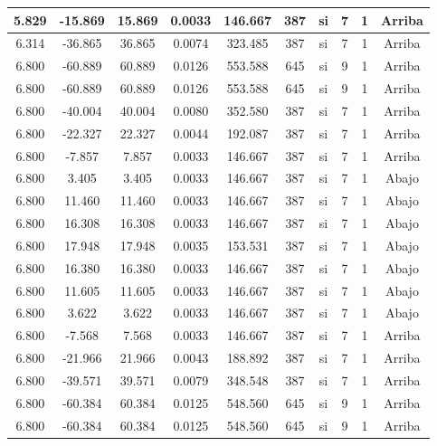 \begin{table}[H]
{\begin{tabular}{|c|c|c|c|c|c|c|c|c|c|}
    \hline
    5.829 & -15.869 & 15.869 & 0.0033 & 146.667 & 387 & si  & 7   & 1   & Arriba \bigstrut\\
    \hline
    6.314 & -36.865 & 36.865 & 0.0074 & 323.485 & 387 & si  & 7   & 1   & Arriba \bigstrut\\
    \hline
    6.800 & -60.889 & 60.889 & 0.0126 & 553.588 & 645 & si  & 9   & 1   & Arriba \bigstrut\\
    \hline
    6.800 & -60.889 & 60.889 & 0.0126 & 553.588 & 645 & si  & 9   & 1   & Arriba \bigstrut\\
    \hline
    6.800 & -40.004 & 40.004 & 0.0080 & 352.580 & 387 & si  & 7   & 1   & Arriba \bigstrut\\
    \hline
    6.800 & -22.327 & 22.327 & 0.0044 & 192.087 & 387 & si  & 7   & 1   & Arriba \bigstrut\\
    \hline
    6.800 & -7.857 & 7.857 & 0.0033 & 146.667 & 387 & si  & 7   & 1   & Arriba \bigstrut\\
    \hline
    6.800 & 3.405 & 3.405 & 0.0033 & 146.667 & 387 & si  & 7   & 1   & Abajo \bigstrut\\
    \hline
    6.800 & 11.460 & 11.460 & 0.0033 & 146.667 & 387 & si  & 7   & 1   & Abajo \bigstrut\\
    \hline
    6.800 & 16.308 & 16.308 & 0.0033 & 146.667 & 387 & si  & 7   & 1   & Abajo \bigstrut\\
    \hline
    6.800 & 17.948 & 17.948 & 0.0035 & 153.531 & 387 & si  & 7   & 1   & Abajo \bigstrut\\
    \hline
    6.800 & 16.380 & 16.380 & 0.0033 & 146.667 & 387 & si  & 7   & 1   & Abajo \bigstrut\\
    \hline
    6.800 & 11.605 & 11.605 & 0.0033 & 146.667 & 387 & si  & 7   & 1   & Abajo \bigstrut\\
    \hline
    6.800 & 3.622 & 3.622 & 0.0033 & 146.667 & 387 & si  & 7   & 1   & Abajo \bigstrut\\
    \hline
    6.800 & -7.568 & 7.568 & 0.0033 & 146.667 & 387 & si  & 7   & 1   & Arriba \bigstrut\\
    \hline
    6.800 & -21.966 & 21.966 & 0.0043 & 188.892 & 387 & si  & 7   & 1   & Arriba \bigstrut\\
    \hline
    6.800 & -39.571 & 39.571 & 0.0079 & 348.548 & 387 & si  & 7   & 1   & Arriba \bigstrut\\
    \hline
    6.800 & -60.384 & 60.384 & 0.0125 & 548.560 & 645 & si  & 9   & 1   & Arriba \bigstrut\\
    \hline
    6.800 & -60.384 & 60.384 & 0.0125 & 548.560 & 645 & si  & 9   & 1   & Arriba \bigstrut\\

\end{tabular}}
\end{table}

